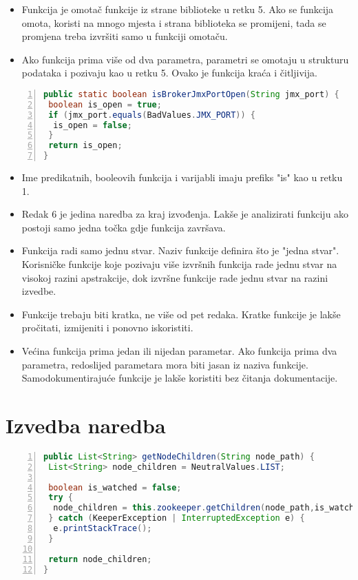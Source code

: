 \documentclass[utf8, diplomski, lmodern, numeric]{fer}
\begin{document}
\begin{itemize}
    \item Funkcija je omotač funkcije iz strane biblioteke u retku 5. Ako se funkcija omota, koristi na mnogo mjesta i strana biblioteka se promijeni, tada se promjena treba izvršiti samo u funkciji omotaču.
    \item Ako funkcija prima više od dva parametra, parametri se omotaju u strukturu podataka i pozivaju kao u retku 5. Ovako je funkcija kraća i čitljivija.
\end{itemize}

\begin{lstlisting}[floatplacement=H, language=Java, caption={Predikatna funkcija}, captionpos=b, basicstyle=\footnotesize, numbers=left, stepnumber=1, backgroundcolor=\color{backcolour}, keywordstyle=\color{blue}]
public static boolean isBrokerJmxPortOpen(String jmx_port) {
 boolean is_open = true;
 if (jmx_port.equals(BadValues.JMX_PORT)) {
  is_open = false;
 }
 return is_open;
}
\end{lstlisting}

\begin{itemize}
    \item Ime predikatnih, booleovih funkcija i varijabli imaju prefiks "is" kao u retku 1.
    \item Redak 6 je jedina naredba za kraj izvođenja. Lakše je analizirati funkciju ako postoji samo jedna točka gdje funkcija završava.
    \item Funkcija radi samo jednu stvar. Naziv funkcije definira što je "jedna stvar". Korisničke funkcije koje pozivaju više izvršnih funkcija rade jednu stvar na visokoj razini apstrakcije, dok izvršne funkcije rade jednu stvar na razini izvedbe.
    \item Funkcije trebaju biti kratka, ne više od pet redaka. Kratke funkcije je lakše pročitati, izmijeniti i ponovno iskoristiti.
    \item Većina funkcija prima jedan ili nijedan parametar. Ako funkcija prima dva parametra, redoslijed parametara mora biti jasan iz naziva funkcije. Samodokumentirajuće funkcije je lakše koristiti bez čitanja dokumentacije.
\end{itemize}


\section{Izvedba naredba}

\begin{lstlisting}[floatplacement=H, language=Java, caption={Izvadak iz razreda Kafka ZooKeeper}, captionpos=b, basicstyle=\footnotesize, numbers=left, stepnumber=1, backgroundcolor=\color{backcolour}, keywordstyle=\color{blue}]
public List<String> getNodeChildren(String node_path) {
 List<String> node_children = NeutralValues.LIST;
 
 boolean is_watched = false;
 try {
  node_children = this.zookeeper.getChildren(node_path,is_watched);
 } catch (KeeperException | InterruptedException e) {
  e.printStackTrace();
 }

 return node_children;
}
\end{lstlisting}
\end{document}
